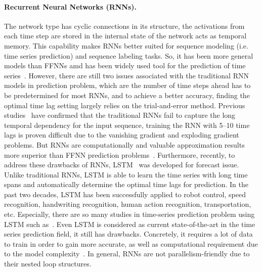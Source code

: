 \documentclass[smallcondensed, natbib]{svjour3}     %
\def \GN#1{\textcolor{tn_orange}{~#1}}			%
\begin{document}
\paragraph{Recurrent Neural Networks (RNNs).} The network type has cyclic connections in its structure, the activations from each time step are stored in the internal state of the network acts as temporal memory. This capability makes RNNs better suited for sequence modeling (i.e. time series prediction) and sequence labeling tasks. So, it has been more general models than FFNNs amd has been widely used tool for the prediction of time series~\citep{ref_connor, ref_saad, ref_petrosian, ref_pollastri, ref_han}. However, there are still two issues associated with the traditional RNN models in prediction problem, which are the number of time steps ahead has to be predetermined for most RNNs, and to achieve a better accuracy, finding the optimal time lag setting largely relies on the trial-and-error method. Previous studies~\citep{ref_hochreiter} have confirmed that the traditional RNNs fail to capture the long temporal dependency for the input sequence, training the RNN with 5–10 time lags is proven difficult due to the vanishing gradient and exploding gradient problems. But RNNs are computationally and valuable approximation results more superior than FFNN prediction problems~\citep{ref_gency, ref_kalaitzakis, ref_saha}. Furthermore, recently, to address these drawbacks of RNNs, LSTM~\citep{ref_hochreiter} was developed for forecast issue. Unlike traditional RNNs, LSTM is able to learn the time series with long time spans and automatically determine the optimal time lags for prediction. In the past two decades, LSTM has been successfully applied to robot control, speed recognition, handwriting recognition, human action recognition, transportation, etc. Especially, there are so many studies in time-series prediction problem using LSTM such as~\citep{ref_xiaolei, ref_titan, ref_zhao, ref_azzouni, ref_nhuan}. Even LSTM is considered as current state-of-the-art in the time series prediction field, it still has drawbacks. Concretely, it requires a lot of data to train in order to gain more accurate, as well as computational requirement due to the model complexity~\citep{ref_hardware}. In general, RNNs are not parallelism-friendly due to their nested loop structures.
\end{document}
